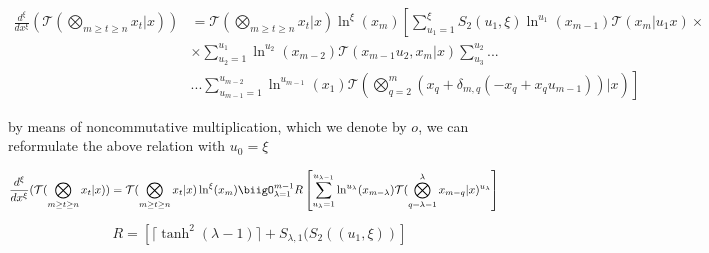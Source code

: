 \begin{theorem}
        \begin{align}
                \frac{d^\xi}{dx^\xi}(\mathcal{T}(\bigotimes_{m 
                \geq t \geq n}x_t | x) ) &= \mathcal{T}(
                \bigotimes_{m \geq t \geq n}x_t| x) \ln^\xi 
                (x_m) \left[\sum_{u_1 = 1}^\xi S_2(u_1, \xi) 
                \ln^{u_1}(x_{m-1}) \mathcal{T}(x_{m}| u_1  x)
                \times \right. \\ & \left. \times \sum_{u_2 = 
                1}^{u_1} \ln^{u_2}(x_{m-2}) \mathcal{T}(x_{m-1}
                u_2, x_m |x) \sum_{u_3}^{u_2}...\right. \\ & ...
                \left. \sum_{u_{m-1}=1}^{u_{m-2}}\ln^{u_{m-1}}(x_1)
                \mathcal{T}(\bigotimes_{q=2}^m (x_q + \delta_{m, q}
                (-x_q + x_q u_{m-1})) |x)\right]
        \end{align}

        by means of noncommutative multiplication, which we 
        denote by \(o\), we can reformulate the above relation 
        with \(u_0 = \xi\)
        
        \begin{align}
                \frac{d^\xi}{dx^\xi}(\mathcal{T}(\bigotimes_{m
                \geq t \geq n}x_t | x) ) &= \mathcal{T}(
                \bigotimes_{m \geq t \geq n}x_t| x) \ln^\xi
                (x_m) \biigO_{\lambda = 1}^{m-1} R\left[
                \sum_{u_{\lambda}=1}^{u_{\lambda-1}}\ln^{u_{
                \lambda}}(x_{m-\lambda}) \mathcal{T}(\bigotimes_{
                q = \lambda-1}^\lambda x_{m-q} |x)^{u_{\lambda}}
                \right]
        \label{w}
        \end{align}
        \begin{align}
                R=\left[ \lceil \tanh^2(\lambda 
                -1)\rceil+S_{\lambda, 1}(S_2((u_1, \xi))\right]
        \end{align}
\end{theorem}
